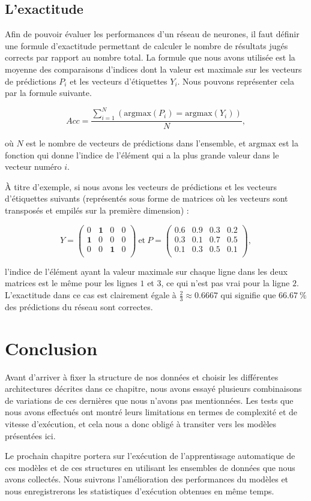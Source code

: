 \subsection{L'exactitude}

Afin de pouvoir évaluer les performances d'un réseau de neurones, il faut définir
une formule d'exactitude permettant de calculer le nombre de résultats jugés
corrects par rapport au nombre total. La formule que nous avons utilisée est
la moyenne des comparaisons d'indices dont la valeur est maximale sur les
vecteurs de prédictions $P_i$ et les vecteurs d'étiquettes $Y_i$. Nous pouvons représenter
cela par la formule suivante.

$$
Acc = \frac{\sum_{i=1}^N(\mathrm{argmax}(P_i) = \mathrm{argmax}(Y_i))}{N},
$$

où $N$ est le nombre de vecteurs de prédictions dans l'ensemble, et
$\mathrm{argmax}$ est la fonction qui donne l'indice de l'élément qui a la plus grande
valeur dans le vecteur numéro $i$.

\`A titre d'exemple, si nous avons les vecteurs de prédictions et les vecteurs
d'étiquettes suivants (représentés sous forme de matrices où les vecteurs sont transposés
et empilés sur la première dimension) :

$$
Y =
\begin{pmatrix}
  0 & \mathbf{1} & 0 & 0\\
  \mathbf{1} & 0 & 0 & 0\\
  0 & 0 & \mathbf{1} & 0\\
\end{pmatrix}
~
\mathrm{et}
~
P =
\begin{pmatrix}
  0.6 & \mathbf{0.9} & 0.3 & 0.2\\
  0.3 & 0.1 & \mathbf{0.7} & 0.5\\
  0.1 & 0.3 & \mathbf{0.5} & 0.1\\
\end{pmatrix},
$$

\noindent l'indice de l'élément ayant la valeur maximale sur chaque ligne dans les deux
matrices est le même pour les lignes $1$ et $3$, ce qui n'est pas vrai pour la
ligne $2$. L'exactitude dans ce cas est clairement égale à $\frac{2}{3} \approx 0.6667$
qui signifie que $66.67~\%$ des prédictions du réseau sont correctes.

\section{Conclusion}

Avant d'arriver à fixer la structure de nos données et choisir les différentes
architectures décrites dans ce chapitre, nous avons essayé plusieurs combinaisons
de variations de ces dernières que nous n'avons pas mentionnées.
Les tests que nous avons effectués ont montré leurs limitations
en termes de complexité et de vitesse d'exécution, et cela nous a donc obligé à
transiter vers les modèles présentées ici.

Le prochain chapitre portera sur l'exécution de l'apprentissage automatique de
ces modèles et de ces structures en utilisant les ensembles de données que nous avons
collectés. Nous suivrons l'amélioration des performances du modèles et nous
enregistrerons les statistiques d'exécution obtenues en même temps.
